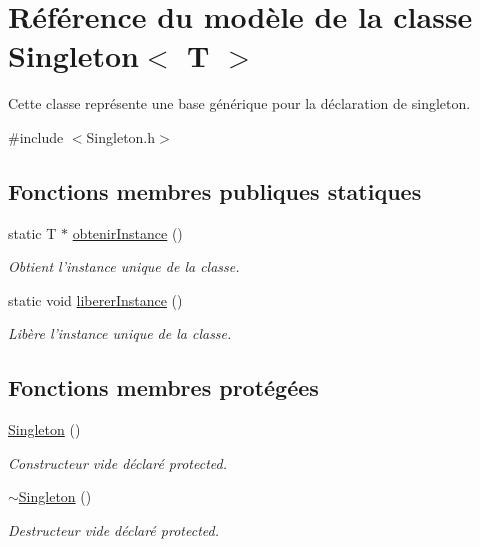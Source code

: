 \hypertarget{class_singleton}{\section{Référence du modèle de la classe Singleton$<$ T $>$}
\label{class_singleton}
}


Cette classe représente une base générique pour la déclaration de singleton.  




{\ttfamily \#include $<$Singleton.\-h$>$}

\subsection*{Fonctions membres publiques statiques}
\begin{DoxyCompactItemize}
\item 
static T $\ast$ \hyperlink{group__utilitaire_ga349c289d77c484b8b4a180843d968b46}{obtenir\-Instance} ()
\begin{DoxyCompactList}\small\item\em Obtient l'instance unique de la classe. \end{DoxyCompactList}\item 
static void \hyperlink{group__utilitaire_ga2b9ae943a004663d769be3f08ae35a0f}{liberer\-Instance} ()
\begin{DoxyCompactList}\small\item\em Libère l'instance unique de la classe. \end{DoxyCompactList}\end{DoxyCompactItemize}
\subsection*{Fonctions membres protégées}
\begin{DoxyCompactItemize}
\item 
\hypertarget{class_singleton_a923b995920da9c06590adb170ab2f890}{\hyperlink{class_singleton_a923b995920da9c06590adb170ab2f890}{Singleton} ()}\label{class_singleton_a923b995920da9c06590adb170ab2f890}

\begin{DoxyCompactList}\small\item\em Constructeur vide déclaré protected. \end{DoxyCompactList}\item 
\hypertarget{class_singleton_ac6e7af82cba33f561bd64e5e0243e7f8}{\hyperlink{class_singleton_ac6e7af82cba33f561bd64e5e0243e7f8}{$\sim$\-Singleton} ()}\label{class_singleton_ac6e7af82cba33f561bd64e5e0243e7f8}

\begin{DoxyCompactList}\small\item\em Destructeur vide déclaré protected. \end{DoxyCompactList}\end{DoxyCompactItemize}


